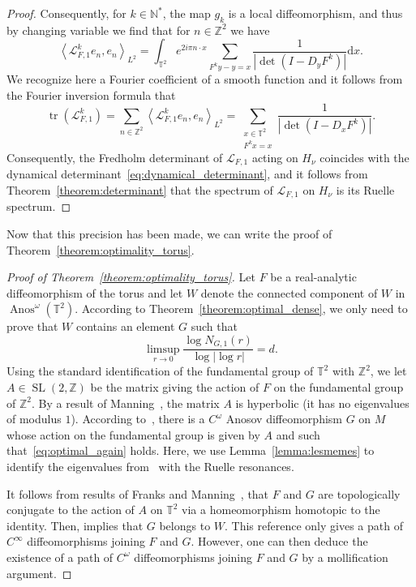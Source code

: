 \documentclass[AHL,Unicode,longabstracts,published]{cedram}
\DeclareMathOperator{\Anos}{Anos}
\DeclareMathOperator{\tr}{tr}
\DeclareMathOperator{\SL}{SL}
\newcommand{\p}[1]{\left(#1\right)}
\newcommand{\va}[1]{\left|#1\right|}
\newcommand{\clL}{\mathcal{L}}
\newcommand{\bbZ}{\mathbb{Z}}
\newcommand{\bbT}{\mathbb{T}}
\newcommand{\bbN}{\mathbb{N}}
\newcommand{\rmd}{\mathrm{d}}
\newcommand*{\MK}{\mkern 2mu}
\begin{document}
\begin{proof}
Consequently, for $k \in \bbN^*$, the map $g_k$ is a local diffeomorphism, and thus by changing variable we find that for $n \in \bbZ^2$ we have
\begin{equation*}
\left\langle\clL_{F,1}^k e_n, e_n\right\rangle_{L^2} = \int_{\bbT^2} e^{2 i \pi n \cdot x} \sum_{F^k y -y = x} \frac{1}{\va{\det\p{I - D_y F^k}}} \rmd x.
\end{equation*}
We recognize here a Fourier coefficient of a smooth function and it follows from the Fourier inversion formula that
\begin{equation*}
\tr \p{\clL_{F,1}^k} = \sum_{n \in \bbZ^2} \left\langle\clL_{F,1}^k e_n, e_n\right\rangle_{L^2} = \sum_{\substack{x \in \bbT^2\\
F^k x = x}}\frac{1}{\va{\det\p{I - D_x F^k}}}.
\end{equation*}
Consequently, the Fredholm determinant of $\clL_{F,1}$ acting on $H_\nu$ coincides with the dynamical determinant~\eqref{eq:dynamical_determinant}, and it follows from Theorem~\ref{theorem:determinant} that the spectrum of $\clL_{F,1}$ on $H_\nu$ is its Ruelle spectrum.
\end{proof}

Now that this precision has been made, we can write the proof of Theorem~\ref{theorem:optimality_torus}.

\begin{proof}[Proof of Theorem~\ref{theorem:optimality_torus}]
Let $F$ be a real-analytic diffeomorphism of the torus and let $W$ denote the connected component of $W$ in $\Anos^\omega(\bbT^2)$. According to Theorem~\ref{theorem:optimal_dense}, we only need to prove that $W$ contains an element $G$ such that
\begin{equation}\label{eq:optimal_again}
\limsup_{r \to 0} \frac{\log N_{G,1}(r)}{\log \va{\log r}} = d.
\end{equation}
Using the standard identification of the fundamental group of $\bbT^2$ with $\bbZ^2$, we let $A \in \SL(2,\bbZ)$ be the matrix giving the action of $F$ on the fundamental group of $\bbZ^2$. By a result of Manning~\cite{no_new}, the matrix $A$ is hyperbolic (it has no eigenvalues of modulus $1$). According to~\cite[Theorem~1.3$\MK$(i)]{optimal_examples}, there is a $C^\omega$ Anosov diffeomorphism $G$ on $M$ whose action on the fundamental group is given by $A$ and such that~\eqref{eq:optimal_again} holds. Here, we use Lemma~\ref{lemma:lesmemes} to identify the eigenvalues from~\cite{optimal_examples} with the Ruelle resonances.

It follows from results of Franks and Manning~\cite{franks_classification, no_new}, that $F$ and $G$ are topologically conjugate to the action of $A$ on $\bbT^2$ via a homeomorphism homotopic to the identity. Then, \cite[Theorem~1]{space_Anosov} implies that $G$ belongs to $W$. This reference only gives a path of $C^\infty$ diffeomorphisms joining $F$ and $G$. However, one can then deduce the existence of a path of $C^\omega$ diffeomorphisms joining $F$ and $G$ by a mollification argument.
\end{proof}
\end{document}
